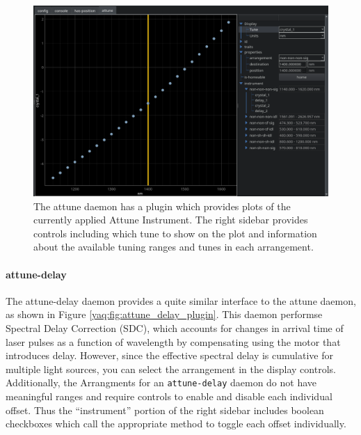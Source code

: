 \begin{landscape}
\begin{figure}
\includegraphics[width=8in]{"yaq/images/attune_plugin"}
\caption[\yaqcqtpy{} Attune Plugin]{
	The attune daemon has a plugin which provides plots of the currently applied Attune Instrument.
	The right sidebar provides controls including which tune to show on the plot and information about the available tuning ranges and tunes in each arrangement.
}
\label{yaq:fig:attune_plugin}
\end{figure}
\end{landscape}

\paragraph{attune-delay}

The attune-delay daemon provides a quite similar interface to the attune daemon, as shown in Figure \ref{yaq:fig:attune_delay_plugin}.
This daemon performse Spectral Delay Correction (SDC), which accounts for changes in arrival time of laser pulses as a function of wavelength by compensating using the motor that introduces delay.
However, since the effective spectral delay is cumulative for multiple light sources, you can select the arrangement in the display controls.
Additionally, the Arrangments for an \texttt{attune-delay} daemon do not have meaningful ranges and require controls to enable and disable each individual offset.
Thus the ``instrument'' portion of the right sidebar includes boolean checkboxes which call the appropriate method to toggle each offset individually.

